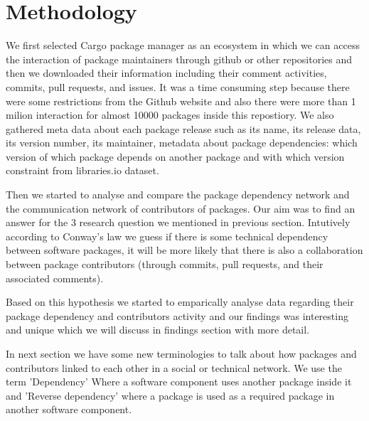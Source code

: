 \section{Methodology}

We first selected Cargo package manager as an ecosystem in which we can access the interaction of package maintainers through github or other repositories and then we downloaded their information including their comment activities, commits, pull requests, and issues. It was a time consuming step because there were some restrictions from the Github website and also there were more than 1 milion interaction for almost 10000 packages inside this repostiory. We also gathered meta data about each package release such as its name, its release data, its version number, its maintainer, metadata about package dependencies: which version of which package depends on another package and with which version constraint from libraries.io dataset.

Then we started to analyse and compare the package dependency network and the communication network of contributors of packages. Our aim was to find an answer for the 3 research question we mentioned in previous section. Intutively according to Conway’s law \cite{Conway1968} we guess if there is some technical dependency between software packages, it will be more likely that there is also a collaboration between package contributors (through commits, pull requests, and their associated comments).

Based on this hypothesis we started to emparically analyse data regarding their package dependency and contributors activity and our findings was interesting and unique which we will discuss in findings section with more detail.

In next section we have some new terminologies to talk about how packages and contributors linked to each other in a social or technical network. We use the term 'Dependency' Where a software component uses another package inside it and 'Reverse dependency' where a package is used as a required package in another software component.

